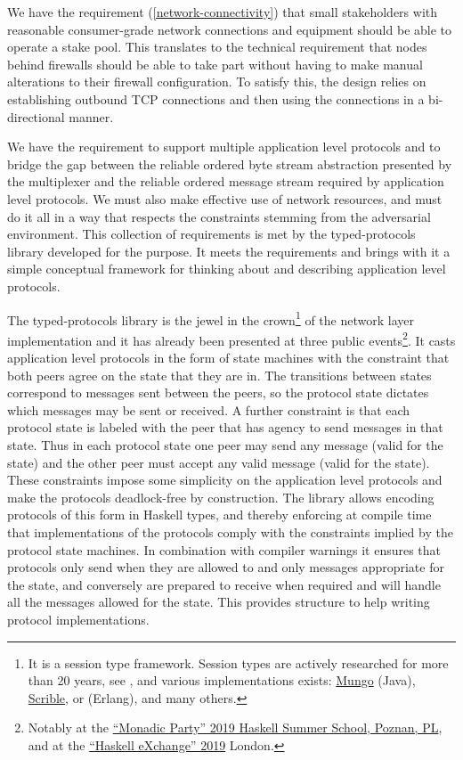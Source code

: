 \documentclass[11pt,a4paper]{article}
\begin{document}
We have the requirement
(\cref{network-connectivity}) that small
stakeholders with reasonable consumer-grade network connections and
equipment should be able to operate a stake pool. This translates to the
technical requirement that nodes behind firewalls should be able to take
part without having to make manual alterations to their firewall
configuration. To satisfy this, the design relies on establishing
outbound TCP connections and then using the connections in a
bi-directional manner.

We have the requirement to support multiple application level protocols
and to bridge the gap between the reliable ordered byte stream
abstraction presented by the multiplexer and the reliable ordered
message stream required by application level protocols. We must also
make effective use of network resources, and must do it all in a way
that respects the constraints stemming from the adversarial environment.
This collection of requirements is met by the typed-protocols library
developed for the purpose. It meets the requirements and brings with it
a simple conceptual framework for thinking about and describing
application level protocols.

The typed-protocols library is the jewel in the crown\footnote{It is a
  session type framework. Session types are actively researched for more
  than 20 years, see \cite{H93, THK94, HVK98}, and various
  implementations exists:
  \href{http://www.dcs.gla.ac.uk/research/mungo/}{{Mungo}} (Java),
  \href{http://www.scrible.org}{{Scrible}}, or \cite{MV11} (Erlang), and
  many others.} of the network layer implementation and it has already
been presented at three public events\footnote{Notably at the
  \href{https://monadic.party/\#talks}{``Monadic Party'' 2019 Haskell
  Summer School, Poznan, PL}, and at the
  \href{https://skillsmatter.com/conferences/11741-haskell-exchange-2019\#program}{{``Haskell
  eXchange'' 2019}} London.}. It casts application level protocols in
the form of state machines with the constraint that both peers agree on
the state that they are in. The transitions between states correspond to
messages sent between the peers, so the protocol state dictates which
messages may be sent or received. A further constraint is that each
protocol state is labeled with the peer that has agency to send messages
in that state. Thus in each protocol state one peer may send any message
(valid for the state) and the other peer must accept any valid message
(valid for the state). These constraints impose some simplicity on the
application level protocols and make the protocols deadlock-free by
construction. The library allows encoding protocols of this form in
Haskell types, and thereby enforcing at compile time that
implementations of the protocols comply with the constraints implied by
the protocol state machines. In combination with compiler warnings it
ensures that protocols only send when they are allowed to and only
messages appropriate for the state, and conversely are prepared to
receive when required and will handle all the messages allowed for the
state. This provides structure to help writing protocol implementations.
\end{document}
